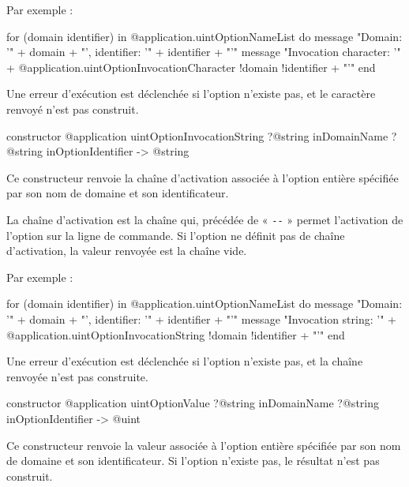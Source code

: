  Par exemple :
\begin{galgas3}
for (domain identifier) in @application.uintOptionNameList do
  message "Domain: '" + domain + "', identifier: '" + identifier + "'\n"
  message "Invocation character: '"
    + @application.uintOptionInvocationCharacter {!domain !identifier} + "'\n"
end
\end{galgas3}

Une erreur d'exécution est déclenchée si l'option n'existe pas, et le caractère renvoyé n'est pas construit.



\begin{galgas3box}
constructor @application uintOptionInvocationString
    ?@string inDomainName
    ?@string inOptionIdentifier -> @string
\end{galgas3box}

Ce constructeur renvoie la chaîne d'activation associée à l'option entière spécifiée par son nom de domaine et son identificateur.

La chaîne d'activation est la chaîne qui, précédée de « \texttt{-{}-} » permet l'activation de l'option sur la ligne de commande. Si l'option ne définit pas de chaîne d'activation, la valeur renvoyée est la chaîne vide.

 Par exemple :
\begin{galgas3}
for (domain identifier) in @application.uintOptionNameList do
  message "Domain: '" + domain + "', identifier: '" + identifier + "'\n"
  message "Invocation string: '"
    + @application.uintOptionInvocationString {!domain !identifier} + "'\n"
end
\end{galgas3}

Une erreur d'exécution est déclenchée si l'option n'existe pas, et la chaîne renvoyée n'est pas construite.



\begin{galgas3box}
constructor @application uintOptionValue
    ?@string inDomainName
    ?@string inOptionIdentifier -> @uint
\end{galgas3box}

Ce constructeur renvoie la valeur associée à l'option entière spécifiée par son nom de domaine et son identificateur. Si l'option n'existe pas, le résultat n'est pas construit.






